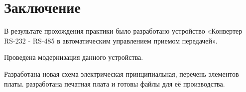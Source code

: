 \section*{Заключение}

В результате прохождения практики было разработано устройство
«Конвертер RS-232 - RS-485 в автоматическим управлением приемом передачей».

Проведена модернизация данного устройства.

Разработана новая схема электрическая принципиальная,
перечень элементов платы.
разработана печатная плата и готовы файлы для её производства.

\newpage


\renewcommand{\refname}{\textbf{Cписок использованных источников}}
\printbibliography

\newpage



